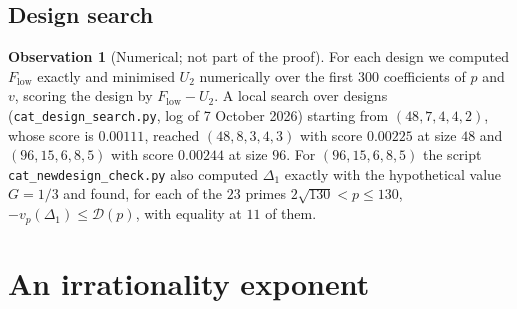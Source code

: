 \documentclass[11pt]{article}
\theoremstyle{definition}
\newtheorem{observation}[theorem]{Observation}
\newcommand{\Dl}{\mathcal{D}}
\begin{document}
\subsection{Design search}

\begin{observation}[Numerical; not part of the proof]
For each design we computed $F_{\mathrm{low}}$ exactly and minimised $U_2$ numerically over the first $300$ coefficients of $p$ and $v$, scoring the design by $F_{\mathrm{low}}-U_2$. A local search over designs (\texttt{cat\_design\_search.py}, log of 7 October 2026) starting from $(48,7,4,4,2)$, whose score is $0.00111$, reached $(48,8,3,4,3)$ with score $0.00225$ at size $48$ and $(96,15,6,8,5)$ with score $0.00244$ at size $96$. For $(96,15,6,8,5)$ the script \texttt{cat\_newdesign\_check.py} also computed $\Delta_1$ exactly with the hypothetical value $G=1/3$ and found, for each of the $23$ primes $2\sqrt{130}<p\le130$, $-v_p(\Delta_1)\le \Dl(p)$, with equality at $11$ of them.
\end{observation}

\section{An irrationality exponent}\label{sec:exponent}
\end{document}
